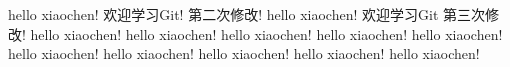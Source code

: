 hello xiaochen! 欢迎学习Git! 第二次修改!
hello xiaochen! 欢迎学习Git  第三次修改!
hello xiaochen!
hello xiaochen!
hello xiaochen!
hello xiaochen!
hello xiaochen!
hello xiaochen!
hello xiaochen!
hello xiaochen!
hello xiaochen!
hello xiaochen!
